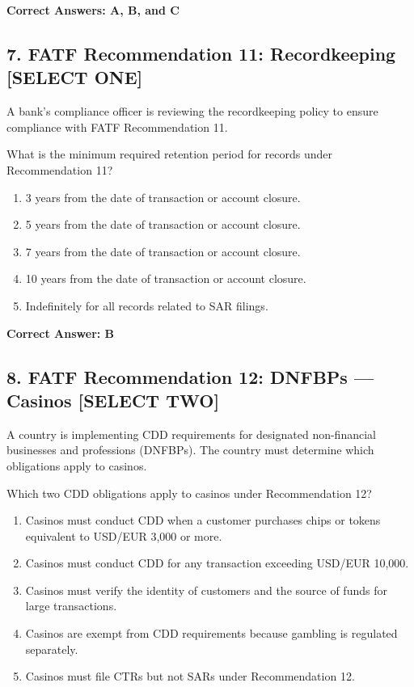 \documentclass[11pt,a4paper]{article}
\begin{document}
	\textbf{Correct Answers: A, B, and C}
	
	\subsection{7. FATF Recommendation 11: Recordkeeping \textnormal{[SELECT ONE]}}
	
	A bank's compliance officer is reviewing the recordkeeping policy to ensure compliance with FATF Recommendation 11.
	
	What is the minimum required retention period for records under Recommendation 11?
	
	\begin{enumerate}[label=\Alph*.]
		\item 3 years from the date of transaction or account closure.
		\item 5 years from the date of transaction or account closure.
		\item 7 years from the date of transaction or account closure.
		\item 10 years from the date of transaction or account closure.
		\item Indefinitely for all records related to SAR filings.
	\end{enumerate}
	
	\textbf{Correct Answer: B}
	
	\subsection{8. FATF Recommendation 12: DNFBPs — Casinos \textnormal{[SELECT TWO]}}
	
	A country is implementing CDD requirements for designated non-financial businesses and professions (DNFBPs). The country must determine which obligations apply to casinos.
	
	Which two CDD obligations apply to casinos under Recommendation 12?
	
	\begin{enumerate}[label=\Alph*.]
		\item Casinos must conduct CDD when a customer purchases chips or tokens equivalent to USD/EUR 3,000 or more.
		\item Casinos must conduct CDD for any transaction exceeding USD/EUR 10,000.
		\item Casinos must verify the identity of customers and the source of funds for large transactions.
		\item Casinos are exempt from CDD requirements because gambling is regulated separately.
		\item Casinos must file CTRs but not SARs under Recommendation 12.
	\end{enumerate}
	
\end{document}
